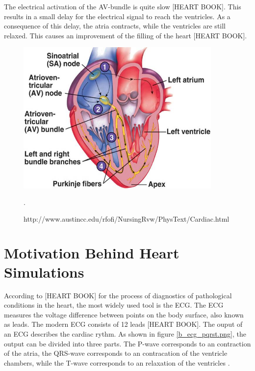 The electrical activation of the AV-bundle is quite slow [HEART BOOK]. This results in a small delay for the electrical signal to reach the ventricles. As a consequence of this delay, the atria contracts, while the ventricles are still relaxed. This causes an improvement of the filling of the heart [HEART BOOK].


\begin{figure}[h]
 \centering 
     \includegraphics[width=0.9\textwidth]{bilder/b_electrical_heart}
     \caption{http://www.austincc.edu/rfofi/NursingRvw/PhysText/Cardiac.html}.
     \label{b_electrical_heart.png}
\end{figure}

\section{Motivation Behind Heart Simulations}
According to [HEART BOOK] for the process of diagnostics of pathological conditions in the heart, the most widely used tool is the ECG. The ECG measures the voltage difference between points on the body surface, also known as leads. The modern ECG consists of 12 leads [HEART BOOK]. The ouput of an ECG describes the cardiac rythm. As shown in figure \ref{b_ecg_pqrst.png}, the output can be divided into three parts. The P-wave corresponds to an contraction of the atria, the QRS-wave corresponds to an contracation of the ventricle chambers, while the T-wave corresponds to an relaxation of the ventricles \cite{article24}. 

